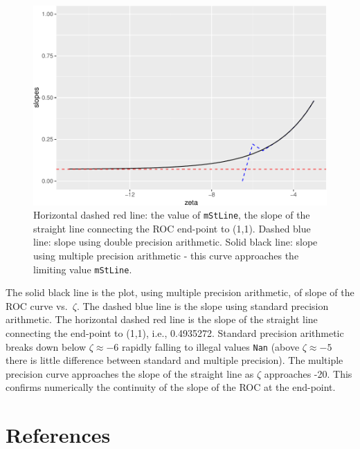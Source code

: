 \documentclass[
]{book}
\begin{document}
\begin{figure}
\centering
\includegraphics{07-rsm-predictions_files/figure-latex/rsm-pred-plots1-1.pdf}
\caption{\label{fig:rsm-pred-plots1}Horizontal dashed red line: the value of \texttt{mStLine}, the slope of the straight line connecting the ROC end-point to (1,1). Dashed blue line: slope using double precision arithmetic. Solid black line: slope using multiple precision arithmetic - this curve approaches the limiting value \texttt{mStLine}.}
\end{figure}

The solid black line is the plot, using multiple precision arithmetic, of slope of the ROC curve vs.~\(\zeta\). The dashed blue line is the slope using standard precision arithmetic. The horizontal dashed red line is the slope of the straight line connecting the end-point to (1,1), i.e., 0.4935272. Standard precision arithmetic breaks down below \(\zeta \approx -6\) rapidly falling to illegal values \texttt{Nan} (above \(\zeta \approx -5\) there is little difference between standard and multiple precision). The multiple precision curve approaches the slope of the straight line as \(\zeta\) approaches -20. This confirms numerically the continuity of the slope of the ROC at the end-point.

\hypertarget{rsm-pred-references}{%
\section{References}\label{rsm-pred-references}}
\end{document}
